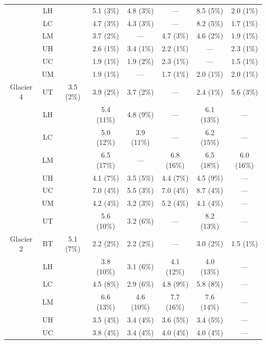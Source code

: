 \documentclass{sfuthesis}
\begin{document}
\begin{appendices}
\begin{table}[h]
\begin{tabular}{cccccccc}
  & LH &   & 5.1 (3\%)& 4.8  (3\%)& --- & 8.5 (5\%) & 2.0 (1\%) \\
  
  & LC &   & 4.7  (3\%)& 4.3  (3\%)& --- & 8.2  (5\%)& 1.7  (1\%)\\
  
  & LM &   & 3.7  (2\%)& --- & 4.7  (3\%)& 4.6  (2\%)& 1.9  (1\%)\\
  
  & UH &   & 2.6   (1\%)& 3.4   (1\%)& 2.2   (1\%)& --- & 2.3   (1\%)\\
  
  & UC &   & 1.9   (1\%)& 1.9   (2\%)& 2.3   (1\%)& --- & 1.5  (1\%) \\
  
  & UM &   & 1.9   (1\%)& --- & 1.7   (1\%)& 2.0 (1\%) & 2.0 (1\%)\\
  
\multirow{-7}{*}{ Glacier 4} & UT & \multirow{-7}{*}{ 3.5 (2\%)} & 3.9 (2\%)& 3.7 (2\%) & --- & 2.4 (1\%)& 5.6 (3\%)\\ \hline
 & LH &  & 5.4 (11\%)& 4.8 (9\%)& --- & 6.1 (13\%)& --- \\ 
 & LC &  & 5.0 (12\%)& 3.9 (11\%)& --- & 6.2 (15\%)& --- \\
 & LM &  & 6.5 (17\%)& --- & 6.8 (16\%)& 6.5 (18\%)& 6.0 (16\%)\\
 & UH &  & 4.1 (7\%)& 3.5 (5\%)& 4.4 (7\%)& 4.5 (9\%)& --- \\
 & UC &  & 7.0 (4\%)& 5.5 (3\%)& 7.0 (4\%)& 8.7 (4\%)& --- \\
 & UM &  & 4.2 (4\%)& 3.2 (3\%)& 5.2 (4\%)& 4.1 (4\%)& --- \\
 & UT &  & 5.6 (10\%)& 3.2 (6\%)& --- & 8.2 (13\%)& --- \\
\multirow{-8}{*}{Glacier 2} & BT & \multirow{-8}{*}{5.1 (7\%)} & 2.2 (2\%)& 2.2 (2\%)& --- & 3.0 (2\%)& 1.5 (1\%) \\ \hline
  
  & LH &   & 3.8 (10\%)& 3.1 (6\%)& 4.1 (12\%) & 4.0 (13\%)& --- \\ 
  
  & LC &   & 4.5 (8\%)& 2.9 (6\%)& 4.8 (9\%)& 5.8 (8\%)& --- \\
  
  & LM &   & 6.6 (13\%)& 4.6 (10\%)& 7.7 (16\%)& 7.6 (14\%)& --- \\
  
  & UH &   & 3.5 (4\%)& 3.4 (4\%)& 3.6 (5\%)& 3.4 (5\%)& --- \\
  
  & UC &   & 3.8 (4\%)& 3.4 (4\%)& 4.0 (4\%)& 4.0 (4\%)& --- \\
  

\end{tabular}
\end{table}
\end{appendices}
\end{document}
